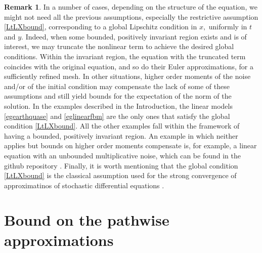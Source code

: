 \documentclass[reqno,12pt]{amsart}
\theoremstyle{plain} %
\theoremstyle{definition} %
\newtheorem{remark}{Remark}[section]
\begin{document}
\begin{remark}
    In a number of cases, depending on the structure of the equation, we might not need all the previous assumptions, especially the restrictive assumption \eqref{LtLXbound}, corresponding to a global Lipschitz condition in $x,$ uniformly in $t$ and $y$. Indeed, when some bounded, positively invariant region exists and is of interest, we may truncate the nonlinear term to achieve the desired global conditions. Within the invariant region, the equation with the truncated term coincides with the original equation, and so do their Euler approximations, for a sufficiently refined mesh. In other situations, higher order moments of the noise and/or of the initial condition may compensate the lack of some of these assumptions and still yield bounds for the expectation of the norm of the solution. In the examples described in the Introduction, the linear models \eqref{egearthquase} and \eqref{eglinearfbm} are the only ones that satisfy the global condition \eqref{LtLXbound}. All the other examples fall within the framework of having a bounded, positively invariant region. An example in which neither applies but bounds on higher order moments compensate is, for example, a linear equation with an unbounded multiplicative noise, which can be found in the github repository \cite{RODEConvEM2023}. Finally, it is worth mentioning that the global condition \eqref{LtLXbound} is the classical assumption used for the strong convergence of approximatinos of stochastic differential equations \cite{AsaiKloeden2016,GruneKloeden2001,HanKloeden2017,HighamKloeden2021,JentzenKloeden2011,KloedenJentzen2007}. 
\end{remark}

\section{Bound on the pathwise approximations}
\label{secpathwiseapproximation}
\end{document}

